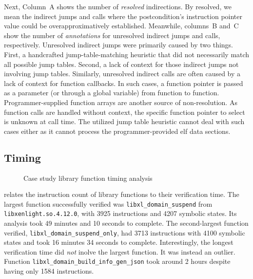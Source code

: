 Next, Column~A shows the number of \emph{resolved} indirections.
By resolved, we mean the indirect jumps and calls where the postcondition's instruction pointer value could be overapproximatively established.
Meanwhile, columns~B and~C show the number of \emph{annotations} for unresolved indirect jumps and calls, respectively.
Unresolved indirect jumps were primarily caused by two things.
First, a handcrafted jump-table-matching heuristic that did not necessarily match all possible jump tables.
Second, a lack of context for those indirect jumps not involving jump tables.
Similarly, unresolved indirect calls are often caused by a lack of context for function callbacks.
In such cases, a function pointer is passed as a parameter (or through a global variable) from function to function.
Programmer-supplied function arrays are another source of non-resolution.
As function calls are handled without context, the specific function pointer to select is unknown at call time.
The utilized jump table heuristic cannot deal with such cases either as it cannot process the programmer-provided \ac{elf} data sections.

\subsection{Timing}\label{sec:timing}
\begin{figure}
  \centering
  \caption{Case study library function timing analysis}\label{fig:distr}
\end{figure}
 relates the instruction count of library functions to their verification time.
The largest function successfully verified was \lstinline|libxl_domain_suspend| from \lstinline|libxenlight.so.4.12.0|, with \num{3925} instructions and \num{4207} symbolic states.
Its analysis took \num{49} minutes and \num{10} seconds to complete.
The second-largest function verified, \lstinline|libxl_domain_suspend_only|, had \num{3713} instructions with \num{4100} symbolic states and took \num{16} minutes \num{34} seconds to complete.
Interestingly, the longest verification time did \emph{not} inolve the largest function.
It was instead an outlier.
Function \lstinline|libxl_domain_build_info_gen_json| took around \num{2} hours despite having only \num{1584} instructions.

